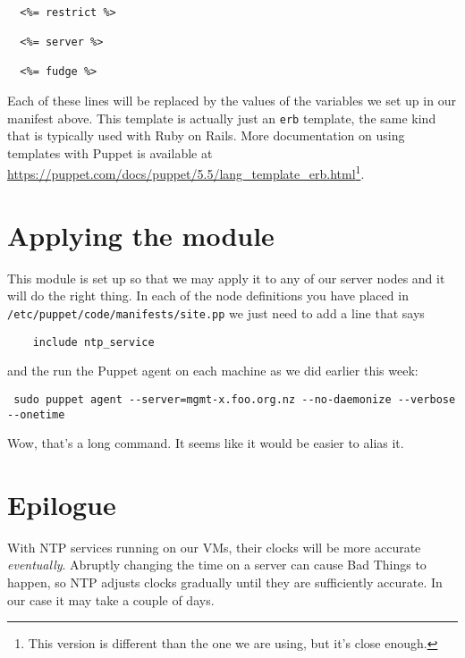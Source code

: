 \documentclass{article}   	%
\begin{document}
\begin{verbatim}

  <%= restrict %>

  <%= server %>

  <%= fudge %>

\end{verbatim}

Each of these lines will be replaced by the values of the variables we set up in our manifest above. This template is actually just an \texttt{erb} template, the same kind that is typically used with Ruby on Rails. More documentation on using templates with Puppet is available at \url{https://puppet.com/docs/puppet/5.5/lang_template_erb.html}\footnote{This version is different than the one we are using, but it's close enough.}.


\section{Applying the module}
This module is set up so that we may apply it to any of our server nodes and it will do the right thing. In each of the node definitions you have placed in \texttt{/etc/puppet/code/manifests/site.pp} we just need to add a line that says

\begin{verbatim}
    include ntp_service
\end{verbatim}

and the run the Puppet agent on each machine as we did earlier this week:

\begin{verbatim}
 sudo puppet agent --server=mgmt-x.foo.org.nz --no-daemonize --verbose --onetime
\end{verbatim}

Wow, that's a long command. It seems like it would be easier to alias it.

\section{Epilogue}
With NTP services running on our VMs, their clocks will be more accurate \emph{eventually}. Abruptly changing the time on a server can cause Bad Things to happen, so NTP adjusts clocks gradually until they are sufficiently accurate. In our case it may take a couple of days.
\end{document}
